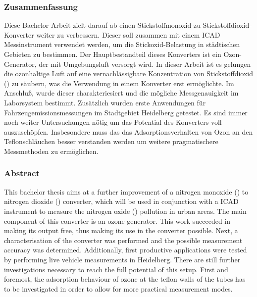 
\subsubsection*{Zusammenfassung}
\label{sec:Zusammenfassung}

Diese Bachelor-Arbeit zielt darauf ab einen
Stickstoffmonoxid-zu-Stickstoffdioxid-Konverter weiter zu
verbessern. Dieser soll zusammen mit einem  ICAD
Messinstrument verwendet werden, um die Stickoxid-Belastung in
städtischen Gebieten zu bestimmen. Der Hauptbestandteil dieses
Konverters ist ein Ozon-Generator, der mit Umgebungsluft versorgt
wird. In dieser Arbeit ist es gelungen die ozonhaltige Luft auf eine
vernachlässigbare Konzentration von Stickstoffdioxid () zu
säubern, was die Verwendung in einem Konverter erst ermöglichte. Im
Anschluß, wurde dieser charakteriesiert und die mögliche 
Messgenauigkeit im Laborsystem bestimmt. Zusätzlich wurden erste
Anwendungen für Fahrzeugemissionsmessungen im Stadtgebiet Heidelberg
getestet. Es sind immer noch weiter Untersuchungen nötig um das
Potential des Konverters voll auszuschöpfen. Insbesondere muss das das
Adsorptionsverhalten von Ozon an den Teflonschläuchen besser
verstanden werden um weitere pragmatischere Messmethoden zu
ermöglichen.


\subsubsection*{Abstract}
\label{sec:abstract}

This bachelor thesis aims at a further improvement of a nitrogen
monoxide () to nitrogen dioxide () converter, which
will be used in conjunction with a  ICAD instrument to
measure the nitrogen oxide () pollution in urban areas. The
main component of this converter is an ozone generator. This work
succeeded in making its output  free, thus making its use in
the converter possible. Next, a characterisation of the converter was
performed and the possible  measurement accuracy was
determined. Additionally, first productive applications were tested by
performing live vehicle measurements in Heidelberg. There are still
further investigations necessary to reach the full potential of this
setup. First and foremost, the adsorption behaviour of ozone at the
teflon walls of the tubes has to be investigated in order to allow for
more practical measurement modes.

